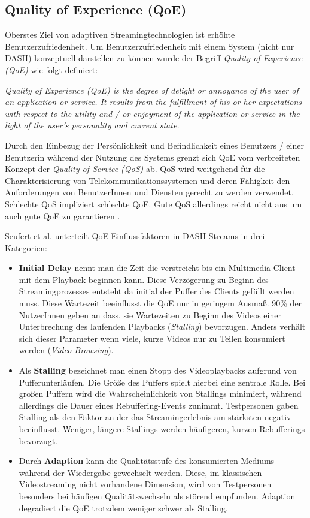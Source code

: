 \documentclass[paper = a4, fontsize = 12pt, parskip = half]{scrartcl} %
\begin{document}
\subsection{Quality of Experience (QoE)}
Oberstes Ziel von adaptiven Streamingtechnologien ist erhöhte Benutzerzufriedenheit. Um Benutzerzufriedenheit mit einem System (nicht nur DASH) konzeptuell darstellen zu können wurde der Begriff \textit{Quality of Experience (QoE)} wie folgt definiert:

\glqq \textit{Quality of Experience (QoE) is the degree of delight or annoyance of the user of an application or service. It results from the fulfillment of his or her expectations with respect to the utility and / or enjoyment of the application or service in the light of the user’s personality and current state.}\grqq \cite{brunnstrom_qualinet_2013}

Durch den Einbezug der Persönlichkeit und Befindlichkeit eines Benutzers / einer Benutzerin während der Nutzung des Systems grenzt sich QoE vom verbreiteten Konzept der \textit{Quality of Service (QoS)} ab. QoS wird weitgehend für die Charakterisierung von Telekommunikationssystemen und deren Fähigkeit den Anforderungen von BenutzerInnen und Diensten gerecht zu werden verwendet. Schlechte QoS impliziert schlechte QoE. Gute QoS allerdings reicht nicht aus um auch gute QoE zu garantieren \cite{brunnstrom_qualinet_2013}.

Seufert et al. \cite{seufert_survey_2015} unterteilt QoE-Einflussfaktoren in DASH-Streams in drei Kategorien:
\begin{itemize}
	\item \textbf{Initial Delay} nennt man die Zeit die verstreicht bis ein Multimedia-Client mit dem Playback beginnen kann. Diese Verzögerung zu Beginn des Streamingprozesses entsteht da initial der Puffer des Clients gefüllt werden muss. Diese Wartezeit beeinflusst die QoE nur in geringem Ausmaß. 90\% der NutzerInnen geben an dass, sie Wartezeiten zu Beginn des Videos einer Unterbrechung des laufenden Playbacks (\textit{Stalling}) bevorzugen. Anders verhält sich dieser Parameter wenn viele, kurze Videos nur zu Teilen konsumiert werden (\textit{Video Browsing}).
	\item Als \textbf{Stalling} bezeichnet man einen Stopp des Videoplaybacks aufgrund von Pufferunterläufen. Die Größe des Puffers spielt hierbei eine zentrale Rolle. Bei großen Puffern wird die Wahrscheinlichkeit von Stallings minimiert, während allerdings die Dauer eines Rebuffering-Events zunimmt. Testpersonen gaben Stalling als den Faktor an der das Streamingerlebnis am stärksten negativ beeinflusst. Weniger, längere Stallings werden häufigeren, kurzen Rebufferings bevorzugt.
	\item Durch \textbf{Adaption} kann die Qualitätsstufe des konsumierten Mediums während der Wiedergabe gewechselt werden. Diese, im klassischen Videostreaming nicht vorhandene Dimension, wird von Testpersonen besonders bei häufigen Qualitätswechseln als störend empfunden. Adaption degradiert die QoE trotzdem weniger schwer als Stalling.
\end{itemize}
\end{document}

